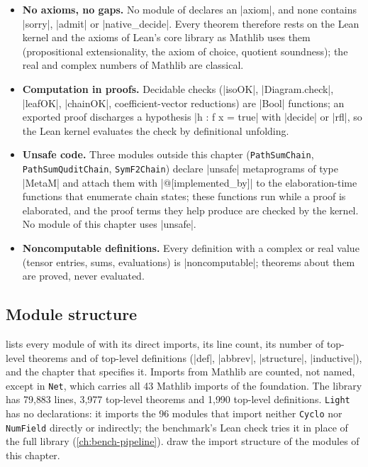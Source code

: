 \begin{itemize}
\item \textbf{No axioms, no gaps.} No module of  declares an
  \lean|axiom|, and none contains \lean|sorry|, \lean|admit| or \lean|native_decide|. Every theorem
  therefore rests on the Lean kernel and the axioms of Lean's core library as Mathlib uses them
  (propositional extensionality, the axiom of choice, quotient soundness); the real and complex
  numbers of Mathlib are classical.
\item \textbf{Computation in proofs.} Decidable checks (\lean|isoOK|, \lean|Diagram.check|,
  \lean|leafOK|, \lean|chainOK|, coefficient-vector reductions) are \lean|Bool| functions; an exported
  proof discharges a hypothesis \lean|h : f x = true| with \lean|decide| or \lean|rfl|, so the Lean
  kernel evaluates the check by definitional unfolding.
\item \textbf{Unsafe code.} Three modules outside this chapter (\texttt{PathSumChain},
  \texttt{PathSumQuditChain}, \texttt{SymF2Chain}) declare \lean|unsafe| metaprograms of type
  \lean|MetaM| and attach them with \lean|@[implemented_by]| to the elaboration-time functions that
  enumerate chain states; these functions run while a proof is elaborated, and the proof terms they
  help produce are checked by the kernel. No module of this chapter uses \lean|unsafe|.
\item \textbf{Noncomputable definitions.} Every definition with a complex or real value (tensor
  entries, sums, evaluations) is \lean|noncomputable|; theorems about them are proved, never
  evaluated.
\end{itemize}

\subsection{Module structure}\label{sec:lean-core-modules}

 lists every module of  with its
direct imports, its line count, its number of top-level theorems and of top-level definitions
(\lean|def|, \lean|abbrev|, \lean|structure|, \lean|inductive|), and the chapter that specifies it.
Imports from Mathlib are counted, not named, except in \texttt{Net}, which carries all 43
Mathlib imports of the foundation. The library has 79{,}883 lines, 3{,}977 top-level theorems and
1{,}990 top-level definitions. \texttt{Light} has no declarations: it imports the 96 modules that import neither \texttt{Cyclo} nor \texttt{NumField} directly or indirectly; the benchmark's Lean check tries it in place of the full library (\cref{ch:bench-pipeline}).  draw the import structure of the modules
of this chapter.

